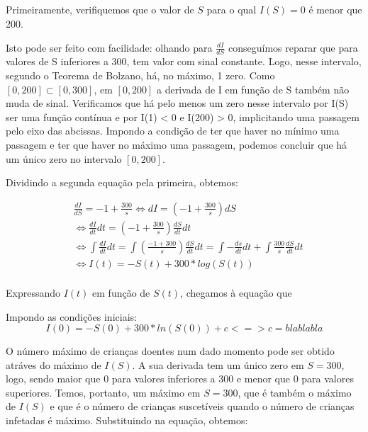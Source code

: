 \documentclass[portuguese, a4paper]{article}
\begin{document}
	\subsection{}
		\subsubsection{}
		\par %
		Primeiramente, verifiquemos que o valor de $S$ para o qual $I(S) = 0$ é menor que 200.
		\par
		Isto pode ser feito com facilidade: olhando para $\frac{dI}{dS}$ conseguímos reparar que para valores
		de S inferiores a 300, tem valor com sinal constante. Logo, nesse intervalo, segundo o Teorema de Bolzano,
		há, no máximo, 1 zero. Como $[0, 200] \subset [0, 300]$, em $[0, 200]$ a derivada de I em função de S também não muda de sinal.
		Verificamos que há pelo menos um zero nesse intervalo por I(S) ser uma função contínua e por I(1) < 0 e I(200) > 0, 
		implicitando uma passagem pelo eixo das abcissas. Impondo a condição de ter que haver no mínimo uma passagem e ter que haver no máximo uma passagem, 
		podemos concluir que há um único zero no intervalo $[0, 200]$.
		\par
		Dividindo a segunda equação pela primeira, obtemos:
		
		\begin{equation} \label{di}
		\begin{split}
			& \frac{dI}{dS} = -1 + \frac{300}{s}
			\Leftrightarrow dI = \left(-1 + \frac{300}{s}\right)dS   \\ 
			& \Leftrightarrow \frac{dI}{dt} dt = \left( -1 + \frac{300}{s}\right) \frac{dS}{dt} dt \\ 
			& \Leftrightarrow \int\frac{dI}{dt}dt = \int\left(\frac{-1 + 300}{s}\right)\frac{dS}{dt}dt =
			\int - \frac{ds}{dt}dt + \int\frac{300}{s}\frac{dS}{dt}dt \\
			& \Leftrightarrow I(t) = -S(t) + 300*log(S(t)) \\
		\end{split}
		\end{equation}

		Expressando $I(t)$ em função de $S(t)$, chegamos à equação que

		Impondo as condições iniciais:
		$$I(0) = -S(0) + 300* ln(S(0)) + c <=> c = bla bla bla$$


		O número máximo de crianças doentes num dado momento pode ser obtido
		atráves do máximo de $I(S)$. A sua derivada tem um único zero em $S = 300$,
		logo, sendo maior que 0 para valores inferiores a 300 e menor que 0 para valores superiores.
		Temos, portanto, um máximo em $S = 300$, que é também o máximo de $I(S)$ e que é
		o número de crianças suscetíveis quando o número de crianças infetadas é máximo.
		Substituindo na equação, obtemos:
\end{document}
